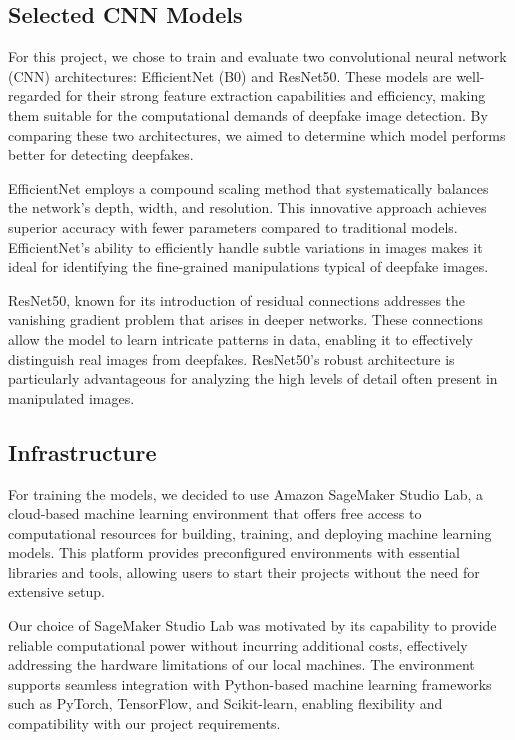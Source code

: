 \documentclass[conference]{IEEEtran}
\begin{document}
\subsection*{Selected CNN Models}
For this project, we chose to train and evaluate two convolutional neural network (CNN) architectures: EfficientNet (B0) and ResNet50. These models are well-regarded for their strong feature extraction capabilities and efficiency, making them suitable for the computational demands of deepfake image detection. By comparing these two architectures, we aimed to determine which model performs better for detecting deepfakes.

EfficientNet employs a compound scaling method that systematically balances the network's depth, width, and resolution. This innovative approach achieves superior accuracy with fewer parameters compared to traditional models. EfficientNet's ability to efficiently handle subtle variations in images makes it ideal for identifying the fine-grained manipulations typical of deepfake images.

ResNet50, known for its introduction of residual connections addresses the vanishing gradient problem that arises in deeper networks. These connections allow the model to learn intricate patterns in data, enabling it to effectively distinguish real images from deepfakes. ResNet50's robust architecture is particularly advantageous for analyzing the high levels of detail often present in manipulated images.

\subsection*{Infrastructure}
For training the models, we decided to use Amazon SageMaker Studio Lab, a cloud-based machine learning environment that offers free access to computational resources for building, training, and deploying machine learning models. This platform provides preconfigured environments with essential libraries and tools, allowing users to start their projects without the need for extensive setup.

Our choice of SageMaker Studio Lab was motivated by its capability to provide reliable computational power without incurring additional costs, effectively addressing the hardware limitations of our local machines. The environment supports seamless integration with Python-based machine learning frameworks such as PyTorch, TensorFlow, and Scikit-learn, enabling flexibility and compatibility with our project requirements.
\end{document}
